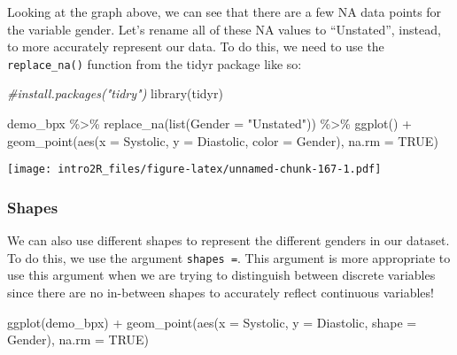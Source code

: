 \documentclass[
]{book}
\newenvironment{Shaded}{\begin{snugshade}}{\end{snugshade}}
\newcommand{\AttributeTok}[1]{\textcolor[rgb]{0.77,0.63,0.00}{#1}}
\newcommand{\CommentTok}[1]{\textcolor[rgb]{0.56,0.35,0.01}{\textit{#1}}}
\newcommand{\ConstantTok}[1]{\textcolor[rgb]{0.00,0.00,0.00}{#1}}
\newcommand{\FunctionTok}[1]{\textcolor[rgb]{0.00,0.00,0.00}{#1}}
\newcommand{\NormalTok}[1]{#1}
\newcommand{\SpecialCharTok}[1]{\textcolor[rgb]{0.00,0.00,0.00}{#1}}
\newcommand{\StringTok}[1]{\textcolor[rgb]{0.31,0.60,0.02}{#1}}
\begin{document}
Looking at the graph above, we can see that there are a few NA data points for the variable gender. Let's rename all of these NA values to ``Unstated'', instead, to more accurately represent our data. To do this, we need to use the \texttt{replace\_na()} function from the tidyr package like so:

\begin{Shaded}
\begin{Highlighting}[]
\CommentTok{\#install.packages("tidry")}
\FunctionTok{library}\NormalTok{(tidyr)}
\end{Highlighting}
\end{Shaded}

\begin{Shaded}
\begin{Highlighting}[]
\NormalTok{demo\_bpx }\SpecialCharTok{\%\textgreater{}\%}
    \FunctionTok{replace\_na}\NormalTok{(}\FunctionTok{list}\NormalTok{(}\AttributeTok{Gender =} \StringTok{"Unstated"}\NormalTok{)) }\SpecialCharTok{\%\textgreater{}\%}
    \FunctionTok{ggplot}\NormalTok{() }\SpecialCharTok{+}
        \FunctionTok{geom\_point}\NormalTok{(}\FunctionTok{aes}\NormalTok{(}\AttributeTok{x =}\NormalTok{ Systolic, }
                       \AttributeTok{y =}\NormalTok{ Diastolic, }
                       \AttributeTok{color =}\NormalTok{ Gender), }
                   \AttributeTok{na.rm =} \ConstantTok{TRUE}\NormalTok{)}
\end{Highlighting}
\end{Shaded}

\texttt{[image: intro2R\_files/figure-latex/unnamed-chunk-167-1.pdf]}

\hypertarget{shapes}{%
\subsubsection{Shapes}\label{shapes}}

We can also use different shapes to represent the different genders in our dataset. To do this, we use the argument \texttt{shapes\ =}. This argument is more appropriate to use this argument when we are trying to distinguish between discrete variables since there are no in-between shapes to accurately reflect continuous variables!

\begin{Shaded}
\begin{Highlighting}[]
\FunctionTok{ggplot}\NormalTok{(demo\_bpx) }\SpecialCharTok{+}
  \FunctionTok{geom\_point}\NormalTok{(}\FunctionTok{aes}\NormalTok{(}\AttributeTok{x =}\NormalTok{ Systolic,}
                 \AttributeTok{y =}\NormalTok{ Diastolic,}
                 \AttributeTok{shape =}\NormalTok{ Gender), }
             \AttributeTok{na.rm =} \ConstantTok{TRUE}\NormalTok{)}
\end{Highlighting}
\end{Shaded}
\end{document}
